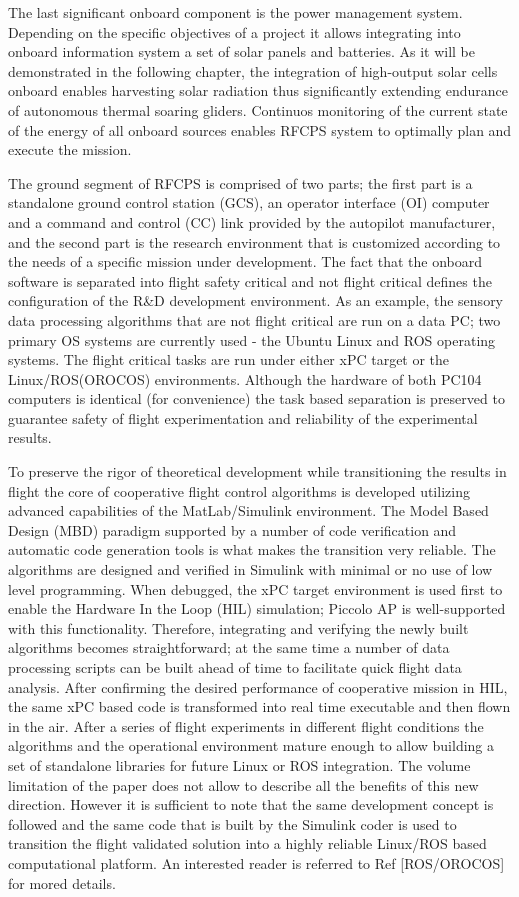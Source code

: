 \documentclass[letterpaper, 10 pt, conference]{ieeeconf}  %
\begin{document}
The last significant onboard component is the power management system. Depending on the specific objectives of a project it allows integrating into onboard information system a set of solar panels and batteries. As it will be demonstrated in the following chapter, the integration of high-output solar cells onboard enables harvesting solar radiation thus significantly extending endurance of autonomous thermal soaring gliders. Continuos monitoring of the current state of the energy of all onboard sources enables RFCPS system to optimally plan and execute the mission.

The ground segment of RFCPS is comprised of two parts; the first part is a standalone ground control station (GCS), an operator interface (OI) computer and a command and control (CC) link provided by the autopilot manufacturer, and the second part is the research environment that is customized according to the needs of a specific mission under development. The fact that the onboard software is separated into flight safety critical and not flight critical defines the configuration of the R\&D development environment. As an example, the sensory data processing algorithms that are not flight critical are run on a data PC; two primary OS systems are currently used - the Ubuntu Linux and ROS operating systems. The flight critical tasks are run under either xPC target or the Linux/ROS(OROCOS) environments. Although the hardware of both PC104 computers is identical (for convenience) the task based separation is preserved to guarantee safety of flight experimentation and reliability of the experimental results.

To preserve the rigor of theoretical development while transitioning the results in flight the core of cooperative flight control algorithms is developed utilizing advanced capabilities of the MatLab/Simulink environment. The Model Based Design (MBD) paradigm supported by a number of code verification and automatic code generation tools is what makes the transition very reliable. The algorithms are designed and verified in Simulink with minimal or no use of low level programming. When debugged, the xPC target environment is used first to enable the Hardware In the Loop (HIL) simulation; Piccolo AP is well-supported with this functionality. Therefore, integrating and verifying the newly built algorithms becomes straightforward; at the same time a number of data processing scripts can be built ahead of time to facilitate quick flight data analysis. After confirming the desired performance of cooperative mission in HIL, the same xPC based code is transformed into real time executable and then flown in the air. 
After a series of flight experiments in different flight conditions the algorithms and the operational environment mature enough to allow building a set of standalone libraries for future Linux or ROS integration. The volume limitation of the paper does not allow to describe all the benefits of this new direction. However it is sufficient to note that the same development concept is  followed and the same code that is built by the Simulink coder is used to transition the flight validated solution into a highly reliable Linux/ROS based computational platform. An interested reader is referred to Ref [ROS/OROCOS] for mored details.
\end{document}
